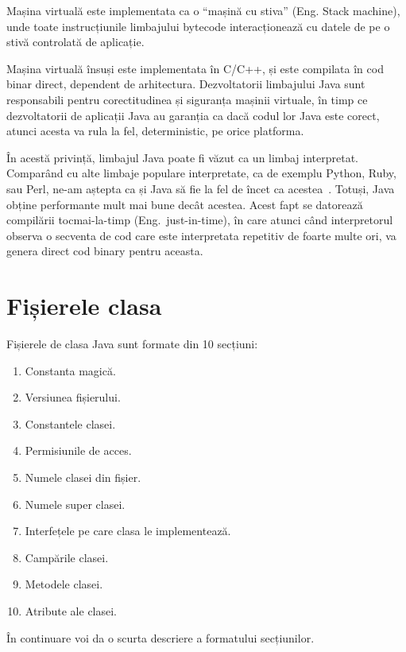 Mașina virtuală este implementata ca o ``mașină cu stiva'' (Eng. Stack
machine), unde toate instrucțiunile limbajului bytecode interacționează
cu datele de pe o stivă controlată de aplicație.

Mașina virtuală însuși este implementata în C/C++, și este compilata în
cod binar direct, dependent de arhitectura. Dezvoltatorii limbajului
Java sunt responsabili pentru corectitudinea și siguranța mașinii
virtuale, în timp ce dezvoltatorii de aplicații Java au garanția ca dacă
codul lor Java este corect, atunci acesta va rula la fel, deterministic,
pe orice platforma.

În acestă privință, limbajul Java poate fi văzut ca un limbaj interpretat.
Comparând cu alte limbaje populare interpretate, ca de exemplu Python,
Ruby, sau Perl, ne-am aștepta ca și Java să fie la fel de încet ca
acestea~\cite{language_benchmarks}.
Totuși, Java obține performante mult mai bune decât
acestea. Acest fapt se datorează compilării tocmai-la-timp (Eng.\
just-in-time), în care atunci când interpretorul observa o secventa de
cod care este interpretata repetitiv de foarte multe ori, va genera
direct cod binary pentru aceasta.


\section{Fișierele clasa}

Fișierele de clasa Java sunt formate din 10
secțiuni\cite{classfile_sections}:

\begin{enumerate}
	\item
	      Constanta magică.
	\item
	      Versiunea fișierului.
	\item
	      Constantele clasei.
	\item
	      Permisiunile de acces.
	\item
	      Numele clasei din fișier.
	\item
	      Numele super clasei.
	\item
	      Interfețele pe care clasa le implementează.
	\item
	      Campările clasei.
	\item
	      Metodele clasei.
	\item
	      Atribute ale clasei.
\end{enumerate}

În continuare voi da o scurta descriere a formatului secțiunilor.

